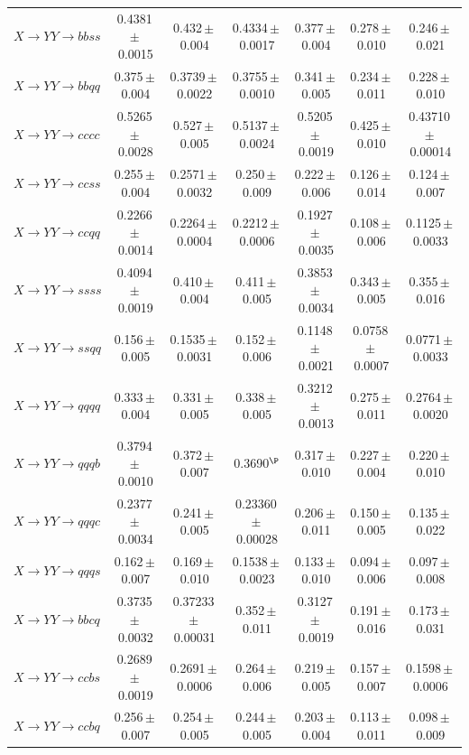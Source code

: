 \documentclass[12pt]{article}   %
\begin{document}
\begin{landscape}
{\begin{longtable}{@{\extracolsep{\fill}}lcccccc@{}}
$X\to YY\to bbss$ & 0.4381\,$\pm$\,0.0015 & 0.432\,$\pm$\,0.004 & 0.4334\,$\pm$\,0.0017 & 0.377\,$\pm$\,0.004 & 0.278\,$\pm$\,0.010 & 0.246\,$\pm$\,0.021 \\
$X\to YY\to bbqq$ & 0.375\,$\pm$\,0.004 & 0.3739\,$\pm$\,0.0022 & 0.3755\,$\pm$\,0.0010 & 0.341\,$\pm$\,0.005 & 0.234\,$\pm$\,0.011 & 0.228\,$\pm$\,0.010 \\
$X\to YY\to cccc$ & 0.5265\,$\pm$\,0.0028 & 0.527\,$\pm$\,0.005 & 0.5137\,$\pm$\,0.0024 & 0.5205\,$\pm$\,0.0019 & 0.425\,$\pm$\,0.010 & 0.43710\,$\pm$\,0.00014 \\
$X\to YY\to ccss$ & 0.255\,$\pm$\,0.004 & 0.2571\,$\pm$\,0.0032 & 0.250\,$\pm$\,0.009 & 0.222\,$\pm$\,0.006 & 0.126\,$\pm$\,0.014 & 0.124\,$\pm$\,0.007 \\
$X\to YY\to ccqq$ & 0.2266\,$\pm$\,0.0014 & 0.2264\,$\pm$\,0.0004 & 0.2212\,$\pm$\,0.0006 & 0.1927\,$\pm$\,0.0035 & 0.108\,$\pm$\,0.006 & 0.1125\,$\pm$\,0.0033 \\
$X\to YY\to ssss$ & 0.4094\,$\pm$\,0.0019 & 0.410\,$\pm$\,0.004 & 0.411\,$\pm$\,0.005 & 0.3853\,$\pm$\,0.0034 & 0.343\,$\pm$\,0.005 & 0.355\,$\pm$\,0.016 \\
$X\to YY\to ssqq$ & 0.156\,$\pm$\,0.005 & 0.1535\,$\pm$\,0.0031 & 0.152\,$\pm$\,0.006 & 0.1148\,$\pm$\,0.0021 & 0.0758\,$\pm$\,0.0007 & 0.0771\,$\pm$\,0.0033 \\
$X\to YY\to qqqq$ & 0.333\,$\pm$\,0.004 & 0.331\,$\pm$\,0.005 & 0.338\,$\pm$\,0.005 & 0.3212\,$\pm$\,0.0013 & 0.275\,$\pm$\,0.011 & 0.2764\,$\pm$\,0.0020 \\
$X\to YY\to qqqb$ & 0.3794\,$\pm$\,0.0010 & 0.372\,$\pm$\,0.007 & 0.3690$^{\P}$ & 0.317\,$\pm$\,0.010 & 0.227\,$\pm$\,0.004 & 0.220\,$\pm$\,0.010 \\
$X\to YY\to qqqc$ & 0.2377\,$\pm$\,0.0034 & 0.241\,$\pm$\,0.005 & 0.23360\,$\pm$\,0.00028 & 0.206\,$\pm$\,0.011 & 0.150\,$\pm$\,0.005 & 0.135\,$\pm$\,0.022 \\
$X\to YY\to qqqs$ & 0.162\,$\pm$\,0.007 & 0.169\,$\pm$\,0.010 & 0.1538\,$\pm$\,0.0023 & 0.133\,$\pm$\,0.010 & 0.094\,$\pm$\,0.006 & 0.097\,$\pm$\,0.008 \\
$X\to YY\to bbcq$ & 0.3735\,$\pm$\,0.0032 & 0.37233\,$\pm$\,0.00031 & 0.352\,$\pm$\,0.011 & 0.3127\,$\pm$\,0.0019 & 0.191\,$\pm$\,0.016 & 0.173\,$\pm$\,0.031 \\
$X\to YY\to ccbs$ & 0.2689\,$\pm$\,0.0019 & 0.2691\,$\pm$\,0.0006 & 0.264\,$\pm$\,0.006 & 0.219\,$\pm$\,0.005 & 0.157\,$\pm$\,0.007 & 0.1598\,$\pm$\,0.0006 \\
$X\to YY\to ccbq$ & 0.256\,$\pm$\,0.007 & 0.254\,$\pm$\,0.005 & 0.244\,$\pm$\,0.005 & 0.203\,$\pm$\,0.004 & 0.113\,$\pm$\,0.011 & 0.098\,$\pm$\,0.009 \\

\end{longtable}}
\end{landscape}
\end{document}
